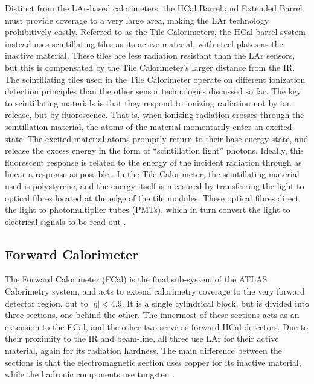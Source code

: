         Distinct from the LAr-based calorimeters, the HCal Barrel and Extended Barrel must provide coverage to a very large area, making the LAr technology prohibitively costly.
        Referred to as the Tile Calorimeters, the HCal barrel system instead uses scintillating tiles as its active material, with steel plates as the inactive material.
        These tiles are less radiation resistant than the LAr sensors, but this is compensated by the Tile Calorimeter's larger distance from the IR.
        The scintillating tiles used in the Tile Calorimeter operate on different ionization detection principles than the other sensor technologies discussed so far.
        The key to scintillating materials is that they respond to ionizing radiation not by ion release, but by fluorescence.
        That is, when ionizing radiation crosses through the scintillation material, the atoms of the material momentarily enter an excited state.
        The excited material atoms promptly return to their base energy state, and release the excess energy in the form of ``scintillation light'' photons.
        Ideally, this fluorescent response is related to the energy of the incident radiation through as linear a response as possible \cite{wiley_radiation_detection}.
        In the Tile Calorimeter, the scintillating material used is polystyrene, and the energy itself is measured by transferring the light to optical fibres located at the edge of the tile modules.
        These optical fibres direct the light to photomultiplier tubes (PMTs), which in turn convert the light to electrical signals to be read out \cite{tcal_tdr}.

    \subsection{Forward Calorimeter}

        The Forward Calorimeter (FCal) is the final sub-system of the ATLAS Calorimetry system, and acts to extend calorimetry coverage to the very forward detector region, out to $|\eta| < 4.9$.
        It is a single cylindrical block, but is divided into three sections, one behind the other.
        The innermost of these sections acts as an extension to the ECal, and the other two serve as forward HCal detectors.
        Due to their proximity to the IR and beam-line, all three use LAr for their active material, again for its radiation hardness.
        The main difference between the sections is that the electromagnetic section uses copper for its inactive material, while the hadronic components use tungsten \cite{Lar_cal_tdr}.

